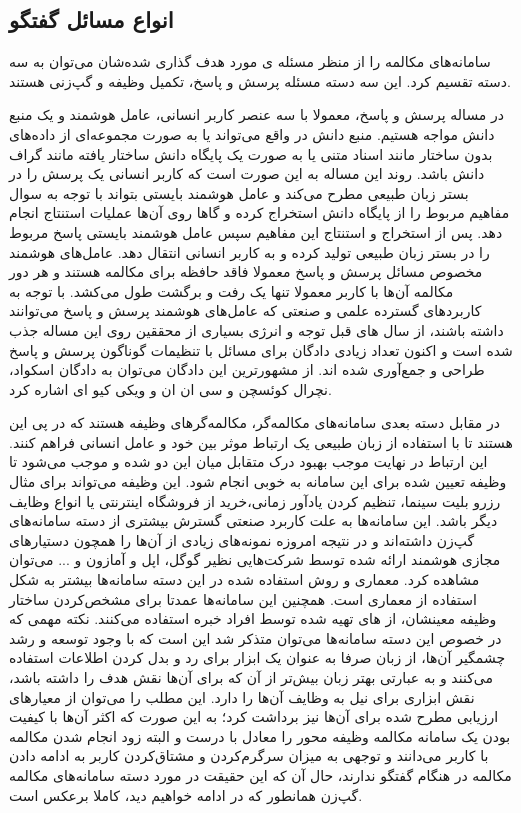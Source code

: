 \subsection{‌انواع مسائل گفتگو}

سامانه‌های مکالمه را از منظر مسئله‌ ی مورد هدف گذاری شده‌شان می‌توان به سه دسته تقسیم کرد. این سه دسته مسئله پرسش و پاسخ، تکمیل وظیفه و گپ‌زنی 
هستند.

در مساله پرسش و پاسخ، معمولا با سه عنصر کاربر انسانی، عامل هوشمند و یک منبع دانش مواجه هستیم. منبع دانش در واقع می‌تواند یا به صورت مجموعه‌ای از داده‌های بدون ساختار مانند اسناد متنی یا به صورت یک پایگاه دانش ساختار یافته مانند گراف دانش باشد. روند این مساله به این صورت است که کاربر انسانی یک پرسش را در بستر زبان طبیعی مطرح می‌کند و عامل هوشمند بایستی بتواند با توجه به سوال مفاهیم مربوط را از پایگاه دانش استخراج کرده و گاها روی آن‌ها عملیات استنتاج انجام دهد. پس از استخراج و استنتاج این مفاهیم سپس عامل هوشمند بایستی پاسخ مربوط را در بستر زبان طبیعی تولید کرده و به کاربر انسانی انتقال دهد.
عامل‌های هوشمند مخصوص مسائل پرسش و پاسخ معمولا فاقد حافظه برای مکالمه هستند و هر دور مکالمه آن‌ها با کاربر معمولا تنها یک رفت و برگشت طول می‌کشد. با توجه به کاربرد‌های گسترده علمی و صنعتی که عامل‌های هوشمند پرسش و پاسخ می‌توانند داشته باشند، از سال های قبل توجه و انرژی بسیاری از محققین روی این مساله جذب شده است و اکنون تعداد زیادی دادگان برای مسائل با تنظیمات گوناگون پرسش و پاسخ طراحی و جمع‌آوری شده اند. از مشهورترین این دادگان می‌توان به دادگان اسکواد، نچرال کوئسچن و سی ان ان  و ویکی کیو ای اشاره کرد.

در مقابل دسته بعدی سامانه‌های مکالمه‌گر،‌ مکالمه‌گر‌های وظیفه هستند که در پی این هستند تا با استفاده از زبان طبیعی یک ارتباط موثر بین خود و عامل انسانی فراهم کنند. این ارتباط در نهایت موجب بهبود درک متقابل میان این دو شده و موجب می‌شود تا وظیفه تعیین شده
برای این سامانه به خوبی انجام شود.
این وظیفه می‌تواند برای مثال رزرو بلیت سینما، تنظیم کردن یاد‌آور زمانی،‌خرید از فروشگاه اینترنتی یا انواع وظایف دیگر باشد.
این سامانه‌ها به علت کاربرد صنعتی گسترش بیشتری از دسته سامانه‌های گپ‌زن داشته‌اند و در نتیجه امروزه نمونه‌های زیادی از آن‌‌ها را همچون دستیارهای مجازی هوشمند ارائه شده توسط شرکت‌هایی نظیر گوگل، اپل	 و آمازون و ... می‌توان مشاهده کرد. معماری و روش استفاده شده در این دسته سامانه‌ها بیشتر به شکل استفاده از معماری 
است.
همچنین این سامانه‌ها عمدتا برای مشخص‌کردن ساختار وظیفه معینشان، از 
 های تهیه شده توسط افراد خبره استفاده می‌کنند.
نکته مهمی که در خصوص این دسته‌ سامانه‌ها می‌توان متذکر شد این است که با وجود توسعه و رشد چشمگیر آن‌ها، از زبان صرفا به عنوان یک ابزار برای رد و بدل کردن اطلاعات استفاده می‌کنند و به عبارتی بهتر زبان بیش‌تر از آن‌ که برای آن‌ها نقش هدف را داشته باشد، نقش ابزاری برای نیل به وظایف آن‌ها را دارد. این مطلب را می‌توان از معیارهای ارزیابی مطرح شده برای آن‌ها نیز برداشت کرد؛ به این صورت که اکثر آن‌ها با کیفیت بودن یک سامانه مکالمه وظیفه محور را معادل با درست و البته زود انجام شدن مکالمه با کاربر می‌دانند و توجهی به میزان سرگرم‌کردن و مشتاق‌کردن کاربر به ادامه دادن مکالمه در هنگام گفتگو ندارند، حال آن که این حقیقت در مورد دسته‌ سامانه‌های مکالمه گپ‌زن همانطور که در ادامه خواهیم دید، کاملا برعکس است.

